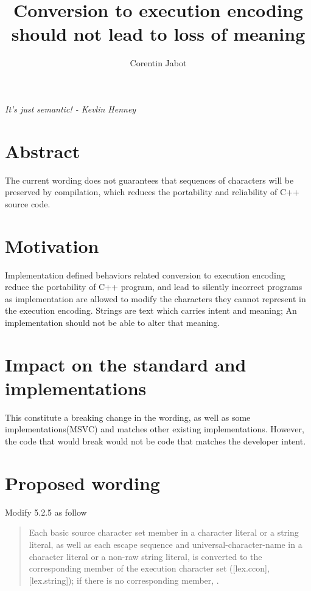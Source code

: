 \documentclass{wg21}
\title{Conversion to execution encoding should not lead to loss of meaning}
\author{Corentin Jabot}{corentin.jabot@gmail.com}
\begin{document}
\maketitle

\begin{flushright}
	\hfill \break
	\hfill \break
	\textit{It's just semantic! - Kevlin Henney}
\end{flushright}


\section{Abstract}

The current wording does not guarantees that sequences of characters will be preserved by compilation, which reduces the portability and reliability of
C++ source code.  

\section{Motivation}

Implementation defined behaviors related conversion to execution encoding reduce the portability of C++ program, and lead to silently incorrect
programs as implementation are allowed to modify the characters they cannot represent in the execution encoding.
Strings are text which carries intent and meaning;  An implementation should not be able to alter that meaning.

\section{Impact on the standard and implementations}

This constitute a breaking change in the wording, as well as some implementations(MSVC) and matches other existing implementations.
However, the code that would break would not be code that matches the developer intent. 

\section{Proposed wording}


Modify 5.2.5 as follow

\begin{quote}

Each basic source character set member in a character literal or a string literal, as well as each escape sequence and universal-character-name in a character literal or a non-raw string literal, is converted to the corresponding member of the execution character set ([lex.ccon], [lex.string]); if there is no corresponding member, .

\end{quote}
\end{document}
